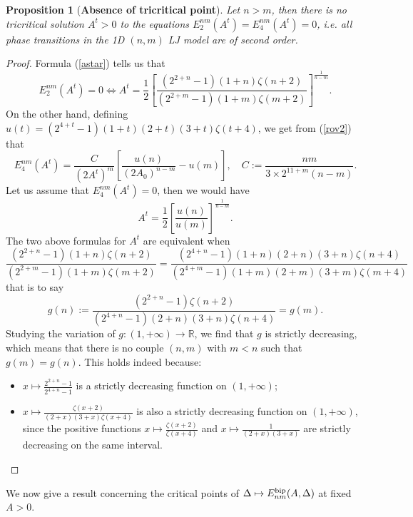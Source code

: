 \documentclass[12pt]{iopart}
\newtheorem{prop}[thm]{Proposition}
\theoremstyle{definition}
\newcommand{\R}{\mathbb R}
\begin{document}
\begin{prop}[\textbf{Absence of tricritical point}]
Let $n>m$, then there is no tricritical solution $A^t>0$ to the equations
$E_2^{nm}(A^t)=E_4^{nm}(A^t)=0$, i.e. all phase transitions in
the 1D $(n,m)$ LJ model are of second order.
\end{prop}
\begin{proof}
Formula (\ref{astar}) tells us that 
$$
E_2^{nm}(A^t)=0 \iff A^t = \frac{1}{2} 
\left[ \frac{(2^{2+n}-1)(1+n)\zeta(n+2)}{(2^{2+m}-1)(1+m)\zeta(m+2)}
\right]^{\frac{1}{n-m}}.
$$
On the other hand, defining $u(t)=(2^{4+t}-1)(1+t)(2+t)(3+t)\zeta(t+4)$,
we get from (\ref{rov2}) that
$$
E_4^{nm}(A^t) = \frac{C}{(2A^t)^m} \left[\frac{u(n)}{(2A_0)^{n-m}}-u(m) \right],
\quad C:=\frac{nm}{3\times 2^{11+m}(n-m)}.
$$
Let us assume that $E_4^{nm}(A^t)=0$, then we would have
$$
A^t=\frac{1}{2}\left[ \frac{u(n)}{u(m)} \right]^{\frac{1}{n-m}} .
$$
The two above formulas for $A^t$ are equivalent when
$$
\frac{(2^{2+n}-1)(1+n)\zeta(n+2)}{(2^{2+m}-1)(1+m)\zeta(m+2)}
=\frac{(2^{4+n}-1)(1+n)(2+n)(3+n)\zeta(n+4)}{(2^{4+m}-1)(1+m)(2+m)(3+m)\zeta(m+4)}
$$
that is to say
$$
g(n):=\frac{(2^{2+n}-1)\zeta(n+2)}{(2^{4+n}-1)(2+n)(3+n)\zeta(n+4)}=g(m).
$$
Studying the variation of $g:(1,+\infty) \to \R$, we find that $g$ is strictly
decreasing, which means that there is no couple $(n,m)$ with $m<n$ such
that $g(m)=g(n)$.
This holds indeed because:
\begin{itemize}
\item $x\mapsto \displaystyle\frac{2^{2+n}-1}{2^{4+n}-1}$ is a strictly
decreasing function on $(1,+\infty)$;
\item $x\mapsto \displaystyle\frac{\zeta(x+2)}{(2+x)(3+x)\zeta(x+4)}$ is also
a strictly decreasing function on  $(1,+\infty)$, since the positive functions
$x\mapsto \displaystyle\frac{\zeta(x+2)}{\zeta(x+4)}$ and
$x\mapsto \displaystyle\frac{1}{(2+x)(3+x)} $ are strictly decreasing on
the same interval.
\end{itemize}
\end{proof}

We now give a result concerning the critical points of
$\Delta\mapsto  E^{\rm bip}_{nm}(A,\Delta)$ at fixed $A>0$.
\end{document}
